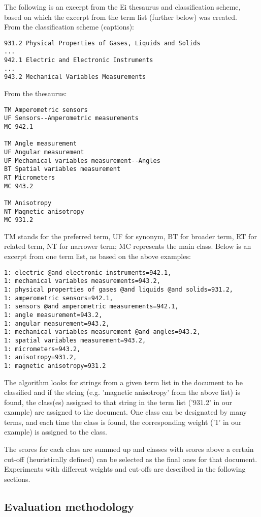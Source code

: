 The following is an excerpt from the Ei thesaurus and classification scheme, based on which the excerpt from the term list (further below) was created.\\
From the classification scheme (captions):
\begin{verbatim}
931.2 Physical Properties of Gases, Liquids and Solids
...
942.1 Electric and Electronic Instruments
...
943.2 Mechanical Variables Measurements
\end{verbatim}
From the thesaurus:
\begin{verbatim}
TM Amperometric sensors
UF Sensors--Amperometric measurements
MC 942.1

TM Angle measurement
UF Angular measurement
UF Mechanical variables measurement--Angles
BT Spatial variables measurement
RT Micrometers
MC 943.2

TM Anisotropy
NT Magnetic anisotropy
MC 931.2
\end{verbatim}
TM stands for the preferred term, UF for synonym, BT for broader term, RT for related term, NT for narrower term; MC represents the main class. Below is an excerpt from one term list, as based on the above examples:
\begin{verbatim}
1: electric @and electronic instruments=942.1,
1: mechanical variables measurements=943.2,
1: physical properties of gases @and liquids @and solids=931.2,
1: amperometric sensors=942.1,
1: sensors @and amperometric measurements=942.1,
1: angle measurement=943.2,
1: angular measurement=943.2,
1: mechanical variables measurement @and angles=943.2,
1: spatial variables measurement=943.2,
1: micrometers=943.2,
1: anisotropy=931.2,
1: magnetic anisotropy=931.2
\end{verbatim}

The algorithm looks for strings from a given term list in the document to be classified and if the string (e.g. 'magnetic anisotropy' from the above list) is found, the class(es) assigned to that string in the term list ('931.2' in our example) are assigned to the document. One class can be designated by many terms, and each time the class is found, the corresponding weight ('1' in our example) is assigned to the class.

The scores for each class are summed up and classes with scores above a certain cut-off (heuristically defined) can be selected as the final ones for that document. Experiments with different weights and cut-offs are described in the following sections.


\subsection{Evaluation methodology}
